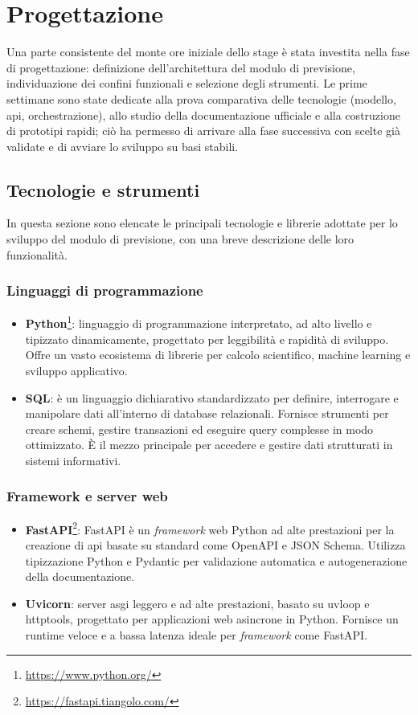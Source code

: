 \chapter{Progettazione}
\label{chap:design}
Una parte consistente del monte ore iniziale dello stage è stata investita nella fase di progettazione: definizione dell’architettura del modulo di previsione, individuazione dei confini funzionali e selezione degli strumenti. Le prime settimane sono state dedicate alla prova comparativa delle tecnologie (modello, \gls{api}, orchestrazione), allo studio della documentazione ufficiale e alla costruzione di prototipi rapidi; ciò ha permesso di arrivare alla fase successiva con scelte già validate e di avviare lo sviluppo su basi stabili.

\section{Tecnologie e strumenti}
\label{sec:tecnologie-strumenti}
In questa sezione sono elencate le principali tecnologie e librerie adottate per lo sviluppo del modulo di previsione, con una breve descrizione delle loro funzionalità.

\subsection{Linguaggi di programmazione}
\begin{itemize}
    \item \textbf{Python}\footnote{\url{https://www.python.org/}}: linguaggio di programmazione interpretato, ad alto livello e tipizzato dinamicamente, progettato per leggibilità e rapidità di sviluppo. Offre un vasto ecosistema di librerie per calcolo scientifico, machine learning e sviluppo applicativo.
    \item \textbf{SQL}: è un linguaggio dichiarativo standardizzato per definire, interrogare e manipolare dati all’interno di database relazionali. Fornisce strumenti per creare schemi, gestire transazioni ed eseguire query complesse in modo ottimizzato. È il mezzo principale per accedere e gestire dati strutturati in sistemi informativi.
    
\end{itemize}

\subsection{Framework e server web}
\begin{itemize}
    \item \textbf{FastAPI}\footnote{\url{https://fastapi.tiangolo.com/}}: FastAPI è un \textit{framework} web Python ad alte prestazioni per la creazione di \gls{api} basate su standard come OpenAPI e JSON Schema. Utilizza tipizzazione Python e Pydantic per validazione automatica e autogenerazione della documentazione.
    \item \textbf{Uvicorn}: server \gls{asgi} leggero e ad alte prestazioni, basato su uvloop e httptools, progettato per applicazioni web asincrone in Python. Fornisce un runtime veloce e a bassa latenza ideale per \textit{framework} come FastAPI.
\end{itemize}

